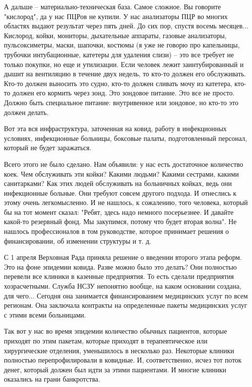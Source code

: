 А дальше – материально-техническая база. Самое сложное. Вы говорите "кислород",
да у нас ПЦРов не купили. У нас анализаторы ПЦР во многих областях выдают
результат через пять дней. До сих пор, спустя восемь месяцев... Кислород,
койки, мониторы, дыхательные аппараты, газовые анализаторы, пульсоксиметры,
маски, шапочки, костюмы (я уже не говорю про капельницы, трубочки
интубационные, катетеры для удаления слизи) – это все требует не только
покупки, но еще и утилизации. Если человек лежит заинтубированный и дышит на
вентиляцию в течение двух недель, то кто-то должен его обслуживать. Кто-то
должен выносить это судно, кто-то должен сливать мочу из катетера, кто-то
должен его кормить через зонд. Это зондовое питание. Это все не просто. Должно
быть специальное питание: внутривенное или зондовое, но кто-то это должен
делать.

Вот эта вся инфраструктура, заточенная на ковид, работу в инфекционных
условиях, инфекционные больницы, боксовые палаты, подготовленный персонал,
который не будет заражаться. 

Всего этого не было сделано. Нам объявили: у нас есть достаточное количество
коек. Чем обслуживать эти койки? Какими людьми? Какими сестрами, какими
санитарками? Как этих людей обслуживать на больничных койках, ведь они
инфекционные больные. Они требуют совсем другого подхода. И отнеслись к этому
очень легкомысленно. И не нашлось, к сожалению, того человека, который бы на
тот момент сказал: "Ребят, здесь надо немного посерьезнее. И давайте какой-то
резервный фонд. Мы закупимся, потому что будет вторая волна". Не нашлось
профессионалов в том руководстве, которое принимает решения о финансировании,
об изменении структуры и т. д.

С 1 апреля Верховная Рада приняла решение о введении второго этапа реформ. Это
на фоне эпидемии ковида. Разве можно было это делать? Они полностью перевели
все клиники в казенные предприятия. То есть сделали предприятия хозрасчетными.
Служба НСЗУ непонятно вообще, на каком основании создана, для чего... Сегодня
она занимается финансированием медицинских услуг по всем регионам. Она
заключала контракты на определенные пакеты медицинских услуг с этими всеми
больницами.

Так вот у нас во время эпидемии количество обычных пациентов, которые приходят
по этим пакетам, которые приходят в терапевтическое или хирургические
отделения, уменьшилось в несколько раз. Некоторые клиники полностью
перепрофилировали в ковидные. И, соответственно, исчез тот поток денег, который
должен был идти за этими пациентами. И многие клиники оказались на грани
банкротства. 

